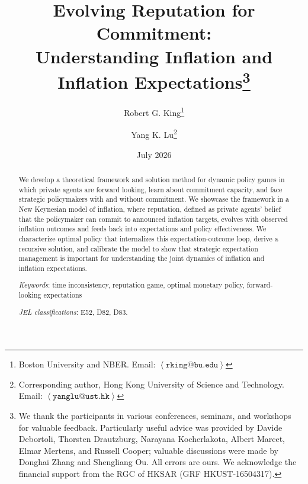 \documentclass[12pt,letter,leqno]{article}
\theoremstyle{asn}
\theoremstyle{lem}
\theoremstyle{slem}
\theoremstyle{prop}
\theoremstyle{appprop}
\theoremstyle{rem}
\theoremstyle{defn}
\begin{document}
\title{\textbf{Evolving Reputation for Commitment:\\ Understanding Inflation and Inflation Expectations}\thanks{
We thank the participants in various conferences, seminars, and workshops for valuable feedback. Particularly useful advice was provided by Davide Debortoli, Thorsten Drautzburg, Narayana Kocherlakota, Albert Marcet, Elmar Mertens, and Russell Cooper; valuable discussions were made by Donghai Zhang and Shengliang Ou. All errors are ours. We acknowledge the
financial support from the RGC of HKSAR (GRF HKUST-16504317).}}
\author{Robert G. King\thanks{%
Boston University and NBER. Email: \href{mailto:rking@bu.edu}{$\left \langle%
\mathtt{rking@bu.edu}\right \rangle $}} \and Yang K. Lu\thanks{%
Corresponding author, Hong Kong University of Science and Technology. Email: 
\href{mailto:yanglu@ust.hk}{$\left \langle \mathtt{yanglu@ust.hk}%
\right
\rangle $}} }
\date{July 2026}
\maketitle

\begin{abstract}
\baselineskip15pt
  
\noindent We develop a theoretical framework and solution method for dynamic policy games in which private agents are forward looking, learn about commitment capacity, and face strategic policymakers with and without commitment. We showcase the framework in a New Keynesian model of inflation, where reputation, defined as private agents' belief that the policymaker can commit to announced inflation targets, evolves with observed inflation outcomes and feeds back into expectations and policy effectiveness. We characterize optimal policy that internalizes this expectation-outcome loop, derive a recursive solution, and calibrate the model to show that strategic expectation management is important for understanding the joint dynamics of inflation and inflation expectations.
\vspace{0.5em}

\vspace{0.5em} \noindent \textit{Keywords}: time inconsistency, reputation
game, optimal monetary policy, forward-looking expectations

\vspace{0.5em} \noindent \textit{JEL classifications}: E52, D82, D83.
\end{abstract}
\end{document}
